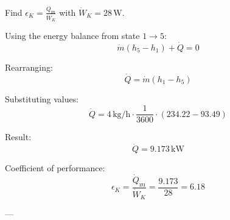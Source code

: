 Find \( \epsilon_K = \frac{\dot{Q}_{\text{zu}}}{\dot{W}_K} \) with \( \dot{W}_K = 28 \, \text{W} \).  

Using the energy balance from state \( 1 \to 5 \):  
\[
\dot{m} (h_5 - h_1) + \dot{Q} = 0
\]  

Rearranging:  
\[
\dot{Q} = \dot{m} (h_1 - h_5)
\]  

Substituting values:  
\[
\dot{Q} = 4 \, \text{kg/h} \cdot \frac{1}{3600} \cdot (234.22 - 93.49)
\]  

Result:  
\[
\dot{Q} = 9.173 \, \text{kW}
\]  

Coefficient of performance:  
\[
\epsilon_K = \frac{\dot{Q}_{\text{zu}}}{\dot{W}_K} = \frac{9.173}{28} = 6.18
\]  

---
